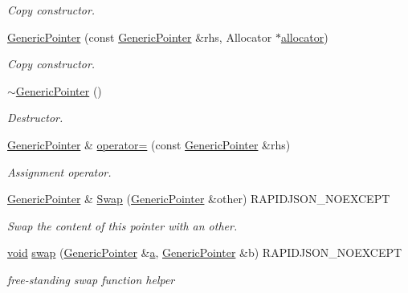 \begin{DoxyCompactItemize}
\begin{DoxyCompactList}\small\item\em Copy constructor. \end{DoxyCompactList}\item 
\hyperlink{classGenericPointer_a4395ca3f5c646e47cc9b93d21d1660ae}{Generic\+Pointer} (const \hyperlink{classGenericPointer}{Generic\+Pointer} \&rhs, Allocator $\ast$\hyperlink{classGenericPointer_aeb61ba8e67260b43090791eeca8b90e0}{allocator})
\begin{DoxyCompactList}\small\item\em Copy constructor. \end{DoxyCompactList}\item 
\hyperlink{classGenericPointer_acf3eb2f7c4ebf9256f638aafa17534cb}{$\sim$\+Generic\+Pointer} ()
\begin{DoxyCompactList}\small\item\em Destructor. \end{DoxyCompactList}\item 
\hyperlink{classGenericPointer}{Generic\+Pointer} \& \hyperlink{classGenericPointer_a1d0174a6e72daa4024da9e08ce1e7951}{operator=} (const \hyperlink{classGenericPointer}{Generic\+Pointer} \&rhs)
\begin{DoxyCompactList}\small\item\em Assignment operator. \end{DoxyCompactList}\item 
\hyperlink{classGenericPointer}{Generic\+Pointer} \& \hyperlink{classGenericPointer_a64fd102622f772efefd445cbed56b16e}{Swap} (\hyperlink{classGenericPointer}{Generic\+Pointer} \&other) R\+A\+P\+I\+D\+J\+S\+O\+N\+\_\+\+N\+O\+E\+X\+C\+E\+PT
\begin{DoxyCompactList}\small\item\em Swap the content of this pointer with an other. \end{DoxyCompactList}\item 
\hyperlink{imgui__impl__opengl3__loader_8h_ac668e7cffd9e2e9cfee428b9b2f34fa7}{void} \hyperlink{classGenericPointer_a249c61b5d4bed20c3f8972c57f46a937}{swap} (\hyperlink{classGenericPointer}{Generic\+Pointer} \&\hyperlink{pointer_8h_aeeddce917cf130d62c370b8f216026dd}{a}, \hyperlink{classGenericPointer}{Generic\+Pointer} \&b) R\+A\+P\+I\+D\+J\+S\+O\+N\+\_\+\+N\+O\+E\+X\+C\+E\+PT
\begin{DoxyCompactList}\small\item\em free-\/standing swap function helper \end{DoxyCompactList}\end{DoxyCompactItemize}


